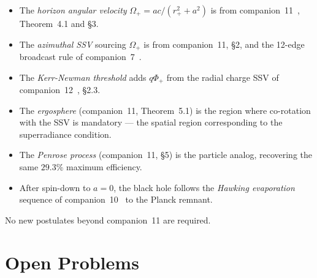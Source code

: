 \documentclass[12pt]{article}
\newcommand{\rplus}{r_+}
\newcommand{\Oplus}{\Omega_+}
\newcommand{\Phiplus}{\Phi_+}
\begin{document}
\begin{itemize}[noitemsep]
  \item The \emph{horizon angular velocity} $\Oplus = ac/(\rplus^2+a^2)$
    is from companion~11~\cite{c11}, Theorem~4.1 and §3.
  \item The \emph{azimuthal SSV} sourcing $\Oplus$ is from companion~11,
    §2, and the 12-edge broadcast rule of companion~7~\cite{c7}.
  \item The \emph{Kerr-Newman threshold} adds $q\Phiplus$ from the
    radial charge SSV of companion~12~\cite{c12}, §2.3.
  \item The \emph{ergosphere} (companion~11, Theorem~5.1) is the region
    where co-rotation with the SSV is mandatory — the spatial region
    corresponding to the superradiance condition.
  \item The \emph{Penrose process} (companion~11, §5) is the particle
    analog, recovering the same $29.3\%$ maximum efficiency.
  \item After spin-down to $a=0$, the black hole follows the
    \emph{Hawking evaporation} sequence of companion~10~\cite{c10}
    to the Planck remnant.
\end{itemize}

No new postulates beyond companion~11 are required.

\section{Open Problems}
\label{sec:open}
\end{document}
